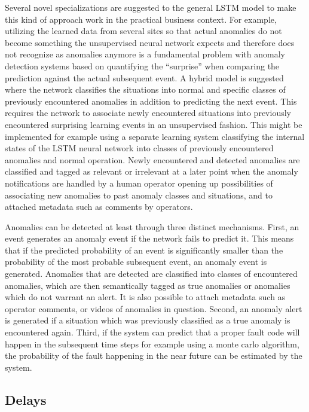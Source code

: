 \documentclass[a4paper,10pt]{article}
\begin{document}
Several novel specializations are suggested to the general LSTM model to make this kind of approach work in the practical business context.
For example, utilizing the learned data from several sites so that actual anomalies do not become something the unsupervised neural network expects and therefore
does not recognize as anomalies anymore is a fundamental problem with anomaly detection systems based on quantifying the ``surprise'' when comparing the prediction against
the actual subsequent event. A hybrid model is suggested where the network classifies the situations into normal and specific classes
of previously encountered anomalies in addition to predicting the next event. This requires the network to associate newly encountered situations into previously
encountered surprising learning events in an unsupervised fashion. This might be implemented for example using a separate learning system classifying the internal
states of the LSTM neural network into classes of previously encountered anomalies and normal operation.
Newly encountered and detected anomalies are classified and tagged as relevant or irrelevant at a later point when the anomaly notifications are handled
by a human operator opening up possibilities of associating new anomalies to past anomaly classes and situations, and to attached metadata such as comments by operators.

Anomalies can be detected at least through three distinct mechanisms. First, an event generates an anomaly event if the network fails to predict it. This means that
if the predicted probability of an event is significantly smaller than the probability of the most probable subsequent event, an anomaly event is generated.
Anomalies that are detected are classified into classes of encountered anomalies, which are then semantically tagged as true anomalies or anomalies which do not warrant an alert.
It is also possible to attach metadata such as operator comments, or videos of anomalies in question. Second, an anomaly alert is generated if a situation
which was previously classified as a true anomaly is encountered again. Third, if the system can predict that a proper fault code will happen in the subsequent
time steps for example using a monte carlo algorithm, the probability of the fault happening in the near future can be estimated by the system.

\subsection{Delays}
\end{document}
